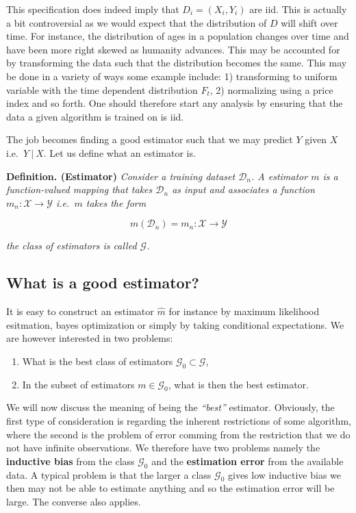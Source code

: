 \documentclass[a4paper,10pt,openany]{book}
\providecommand{\tightlist}{%
 \setlength{\itemsep}{0pt}\setlength{\parskip}{0pt}}
\begin{document}
This specification does indeed imply that \(D_i=(X_i,Y_i)\) are iid. This is actually a bit controversial as we would expect that the distribution of \(D\) will shift over time. For instance, the distribution of ages in a population changes over time and have been more right skewed as humanity advances. This may be accounted for by transforming the data such that the distribution becomes the same. This may be done in a variety of ways some example include: 1) transforming to uniform variable with the time dependent distribution \(F_t\), 2) normalizing using a price index and so forth. One should therefore start any analysis by ensuring that the data a given algorithm is trained on is iid.

The job becomes finding a good estimator such that we may predict \(Y\) given \(X\) i.e.~\(Y\ \vert\ X\). Let us define what an estimator is.

\textbf{Definition. (Estimator)} \emph{Consider a training dataset \(\mathcal{D}_n\). A estimator \(m\) is a function-valued mapping that takes \(\mathcal{D}_n\) as input and associates a function \(m_n : \mathcal{X}\to \mathcal{Y}\) i.e.~\(m\) takes the form}

\[
m(\mathcal{D}_n)=m_n:\mathcal{X}\to \mathcal{Y}
\]

\emph{the class of estimators is called \(\mathcal{G}\).}

\hypertarget{what-is-a-good-estimator}{%
\subsection{What is a good estimator?}\label{what-is-a-good-estimator}}

It is easy to construct an estimator \(\hat{m}\) for instance by maximum likelihood esitmation, bayes optimization or simply by taking conditional expectations. We are however interested in two problems:

\begin{enumerate}
\def\labelenumi{\arabic{enumi}.}
\tightlist
\item
  What is the best class of estimators \(\mathcal{G}_0\subset\mathcal{G}\),
\item
  In the subset of estimators \(m \in \mathcal{G}_0\), what is then the best estimator.
\end{enumerate}

We will now discuss the meaning of being the \emph{``best''} estimator. Obviously, the first type of consideration is regarding the inherent restrictions of some algorithm, where the second is the problem of error comming from the restriction that we do not have infinite observations. We therefore have two problems namely the \textbf{inductive bias} from the class \(\mathcal{G}_0\) and the \textbf{estimation error} from the available data. A typical problem is that the larger a class \(\mathcal{G}_0\) gives low inductive bias we then may not be able to estimate anything and so the estimation error will be large. The converse also applies.
\end{document}
